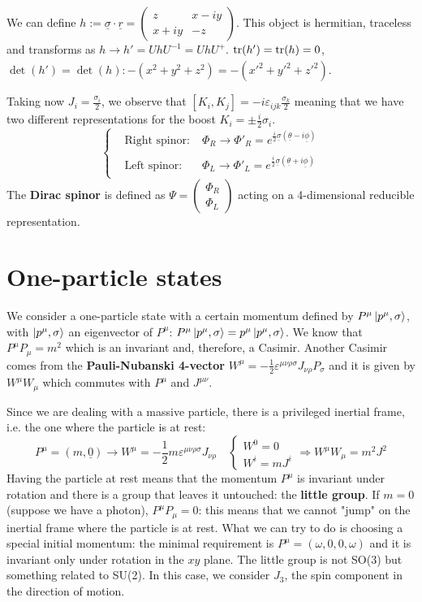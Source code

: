 \documentclass[../main.tex]{subfiles}
\begin{document}
We can define $h:=\underline{\sigma}\cdot\underline{r}=\left(\begin{array}{cc}
    z & x-iy \\
    x+iy & -z
\end{array}\right)$. This object is hermitian, traceless and transforms as $h\xrightarrow[]{}h'=UhU^{-1}=UhU^+$. $\tr(h')=\tr(h)=0$, $\det(h')=\det(h): -(x^2+y^2+z^2)=-(x'^2+y'^2+z'^2)$.

Taking now $J_i=\frac{\sigma_i}{2}$, we observe that $[K_i,K_j]=-i\varepsilon_{ijk}\frac{\sigma_k}{2}$ meaning that we have two different representations for the boost $K_i=\pm\frac{i}{2}\sigma_i$.
\[
\left\{
\begin{aligned}
&\text{Right spinor:}\;&\Phi_R\xrightarrow[]{}\Phi'_R=e^{\frac{i}{2}\underline{\sigma}(\underline{\theta}-i\underline{\phi})}\\
&\text{Left spinor:}\;&\Phi_L\xrightarrow[]{}\Phi'_L=e^{\frac{i}{2}\underline{\sigma}(\underline{\theta}+i\underline{\phi})}
\end{aligned}
\right.
\]
The \textbf{Dirac spinor} is defined as $\Psi=\left(\begin{array}{c}
     \Phi_R \\
     \Phi_L
\end{array}\right)$ acting on a 4-dimensional reducible representation.
\section{One-particle states}
We consider a one-particle state with a certain momentum defined by $P^{\mu}\ket{p^{\mu},\sigma}$, with $\ket{p^{\mu},\sigma}$ an eigenvector of $P^{\mu}$: $P^{\mu}\ket{p^{\mu},\sigma}=p^{\mu}\ket{p^{\mu},\sigma}$. We know that $P^{\mu}P_{\mu}=m^2$ which is an invariant and, therefore, a Casimir. Another Casimir comes from the \textbf{Pauli-Nubanski 4-vector} $W^{\mu}=-\frac{1}{2}\varepsilon^{\mu\nu\rho\sigma}J_{\nu\rho}P_{\sigma}$ and it is given by $W^{\mu}W_{\mu}$ which commutes with $P^{\mu}$ and $J^{\mu\nu}$.

Since we are dealing with a massive particle, there is a privileged inertial frame, i.e. the one where the particle is at rest:
\[
P^{\mu}=(m,\underline{0})\xrightarrow[]{} W^{\mu}=-\frac{1}{2}m\varepsilon^{\mu\nu\rho\sigma}J_{\nu\rho} \quad \begin{cases}
W^0=0\\
W^i=mJ^i
\end{cases}\Rightarrow W^{\mu}W_{\mu}=m^2J^2
\]
Having the particle at rest means that the momentum $P^{\mu}$ is invariant under rotation and there is a group that leaves it untouched: the \textbf{little group}. If $m=0$ (suppose we have a photon), $P^{\mu}P_{\mu}=0$: this means that we cannot "jump" on the inertial frame where the particle is at rest. What we can try to do is choosing a special initial momentum: the minimal requirement is $P^{\mu}=(\omega,0,0,\omega)$ and it is invariant only under rotation in the $xy$ plane. The little group is not SO(3) but something related to SU(2). In this case, we consider $J_3$, the spin component in the direction of motion.
\end{document}
